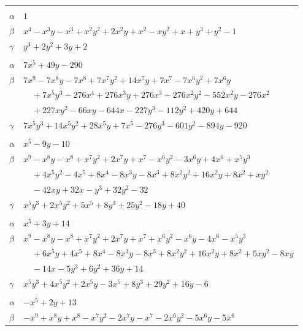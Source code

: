 \documentclass[11pt]{article}
\begin{document}
\begin{longtable}{@{}ll@{}}
\addlinespace[3pt]
\multicolumn{2}{@{}l}{$\{i,j\}=\{6,19\}$, $k_{ij}=3$}\\
$\alpha$ & $1$\\
$\beta$ & $x^{4}-x^{3}y-x^{3}+x^{2}y^{2}+2x^{2}y+x^{2}-xy^{2}+x+y^{3}+y^{2}-1$\\
$\gamma$ & $y^{3}+2y^{2}+3y+2$\\
\addlinespace[3pt]
\multicolumn{2}{@{}l}{$\{i,j\}=\{6,27\}$, $k_{ij}=2^{2}\cdot 3^{2}$}\\
$\alpha$ & $7x^{5}+49y-290$\\
$\beta$ & $7x^{9}-7x^{8}y-7x^{8}+7x^{7}y^{2}+14x^{7}y+7x^{7}-7x^{6}y^{2}+7x^{6}y$\\
 & $\quad +7x^{5}y^{3}-276x^{4}+276x^{3}y+276x^{3}-276x^{2}y^{2}-552x^{2}y-276x^{2}$\\
 & $\quad +227xy^{2}-66xy-644x-227y^{3}-112y^{2}+420y+644$\\
$\gamma$ & $7x^{5}y^{3}+14x^{5}y^{2}+28x^{5}y+7x^{5}-276y^{3}-601y^{2}-894y-920$\\
\addlinespace[3pt]
\multicolumn{2}{@{}l}{$\{i,j\}=\{6,28\}$, $k_{ij}=2^{3}\cdot 3^{2}$}\\
$\alpha$ & $x^{5}-9y-10$\\
$\beta$ & $x^{9}-x^{8}y-x^{8}+x^{7}y^{2}+2x^{7}y+x^{7}-x^{6}y^{2}-3x^{6}y+4x^{6}+x^{5}y^{3}$\\
 & $\quad +4x^{5}y^{2}-4x^{5}+8x^{4}-8x^{3}y-8x^{3}+8x^{2}y^{2}+16x^{2}y+8x^{2}+xy^{2}$\\
 & $\quad -42xy+32x-y^{3}+32y^{2}-32$\\
$\gamma$ & $x^{5}y^{3}+2x^{5}y^{2}+5x^{5}+8y^{3}+25y^{2}-18y+40$\\
\addlinespace[3pt]
\multicolumn{2}{@{}l}{$\{i,j\}=\{6,33\}$, $k_{ij}=2\cdot 3\cdot 5$}\\
$\alpha$ & $x^{5}+3y+14$\\
$\beta$ & $x^{9}-x^{8}y-x^{8}+x^{7}y^{2}+2x^{7}y+x^{7}+x^{6}y^{2}-x^{6}y-4x^{6}-x^{5}y^{3}$\\
 & $\quad +6x^{5}y+4x^{5}+8x^{4}-8x^{3}y-8x^{3}+8x^{2}y^{2}+16x^{2}y+8x^{2}+5xy^{2}-8xy$\\
 & $\quad -14x-5y^{3}+6y^{2}+36y+14$\\
$\gamma$ & $x^{5}y^{3}+4x^{5}y^{2}+2x^{5}y-3x^{5}+8y^{3}+29y^{2}+16y-6$\\
\addlinespace[3pt]
\multicolumn{2}{@{}l}{$\{i,j\}=\{6,34\}$, $k_{ij}=5\cdot 17$}\\
$\alpha$ & $-x^{5}+2y+13$\\
$\beta$ & $-x^{9}+x^{8}y+x^{8}-x^{7}y^{2}-2x^{7}y-x^{7}-2x^{6}y^{2}-5x^{6}y-5x^{6}$\\

\end{longtable}
\end{document}
